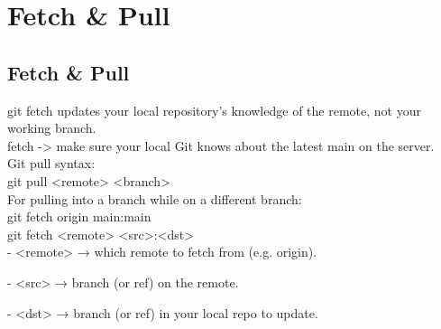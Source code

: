 \chapter{Fetch \& Pull}
\chapteroverlay
\section{Fetch \& Pull}
git fetch updates your local repository’s knowledge of the remote, not your working branch.\\
fetch -> make sure your local Git knows about the latest main on the server.\\

Git pull syntax:\\
git pull <remote> <branch>
\\
For pulling into a branch while on a different branch:\\
git fetch origin main:main\\
git fetch <remote> <src>:<dst>\\
- <remote> → which remote to fetch from (e.g. origin).

- <src> → branch (or ref) on the remote.

- <dst> → branch (or ref) in your local repo to update.